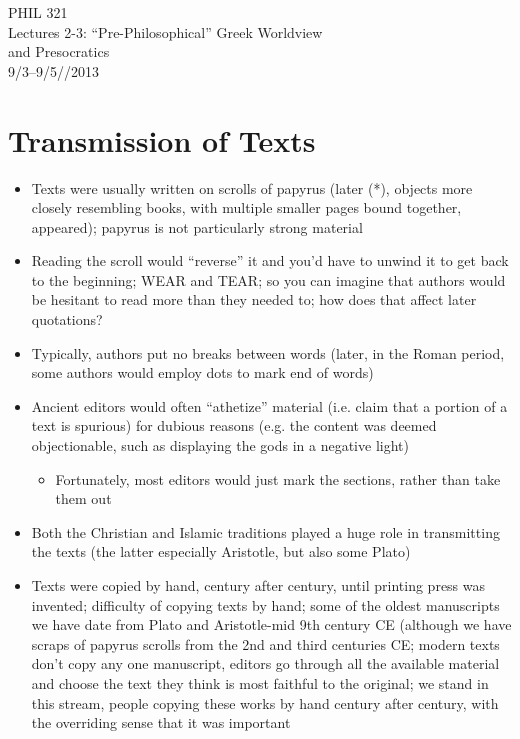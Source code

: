 \documentclass[11pt]{article}
\begin{document}
\thispagestyle{empty}
\begin{center} \LARGE{PHIL 321\\ Lectures 2-3: ``Pre-Philosophical'' Greek Worldview\\ and Presocratics}\\ \vspace*{2mm}
\large{9/3--9/5//2013}\end{center}
\thispagestyle{empty}\vspace*{3mm}

\section*{Transmission of Texts}

\begin{itemize}\item{Texts were usually written on scrolls of papyrus (later (*), objects more closely resembling books, with multiple smaller pages bound together, appeared); papyrus is not particularly strong material}\item{Reading the scroll would ``reverse'' it and you'd have to unwind it to get back to the beginning; WEAR and TEAR; so you can imagine that authors would be hesitant to read more than they needed to; how does that affect later quotations?}\item{Typically, authors put no breaks between words (later, in the Roman period, some authors would employ dots to mark end of words)}\item{Ancient editors would often ``athetize'' material (i.e. claim that a portion of a text is spurious) for dubious reasons (e.g. the content was deemed objectionable, such as displaying the gods in a negative light)}\begin{itemize}\item{Fortunately, most editors would just mark the sections, rather than take them out}\end{itemize}\item{Both the Christian and Islamic traditions played a huge role in transmitting the texts (the latter especially Aristotle, but also some Plato)}\item{Texts were copied by hand, century after century, until printing press was invented; difficulty of copying texts by hand; some of the oldest manuscripts we have date from Plato and Aristotle-mid 9th century CE (although we have scraps of papyrus scrolls from the 2nd and third centuries CE; modern texts don't copy any one manuscript, editors go through all the available material and choose the text they think is most faithful to the original; we stand in this stream, people copying these works by hand century after century, with the overriding sense that it was important}\end{itemize}
\end{document}
